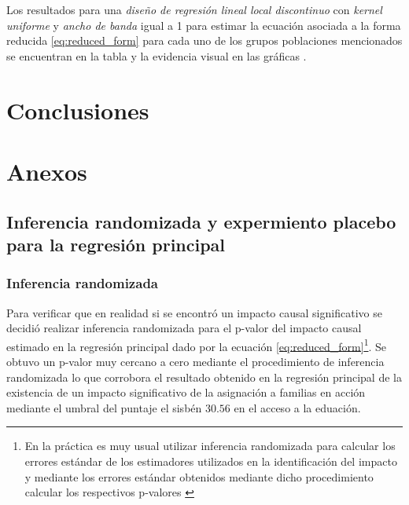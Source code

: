\documentclass[AER]{AEA}
\begin{document}
Los resultados para una \textit{diseño de regresión lineal local discontinuo} con \textit{kernel uniforme} y \textit{ancho de banda} igual a 1 para estimar la ecuación asociada a la forma reducida \ref{eq:reduced_form} para cada uno de los grupos poblaciones mencionados se encuentran en la tabla   y la evidencia visual en las gráficas   .




\section{Conclusiones}





\clearpage

\section{Anexos}

\subsection{Inferencia randomizada y expermiento placebo para la regresión principal}

\subsubsection{Inferencia randomizada}

Para verificar que en realidad si se encontró un impacto causal significativo se decidió realizar inferencia randomizada para el p-valor del impacto causal estimado en la regresión principal dado por la ecuación \ref{eq:reduced_form}\footnote{En la práctica es muy usual utilizar inferencia randomizada para calcular los errores estándar de los estimadores utilizados en la identificación del impacto y mediante los errores estándar obtenidos mediante dicho procedimiento calcular los respectivos p-valores \citep{Duflo2017HandbookExperiments}}. Se obtuvo un p-valor muy cercano a cero mediante el procedimiento de inferencia randomizada lo que corrobora el resultado obtenido en la regresión principal de la existencia de un impacto significativo de la asignación a familias en acción mediante el umbral del puntaje el sisbén $30.56$ en el acceso a la eduación. 
\end{document}

